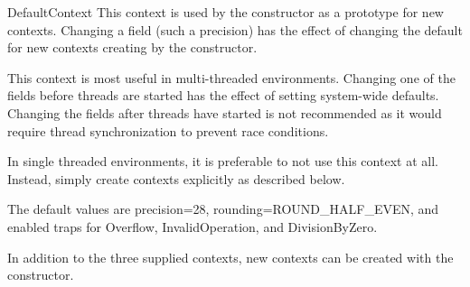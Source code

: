 \begin{classdesc*}{DefaultContext}
  This context is used by the  constructor as a prototype for
  new contexts.  Changing a field (such a precision) has the effect of
  changing the default for new contexts creating by the 
  constructor.

  This context is most useful in multi-threaded environments.  Changing one of
  the fields before threads are started has the effect of setting system-wide
  defaults.  Changing the fields after threads have started is not recommended
  as it would require thread synchronization to prevent race conditions.

  In single threaded environments, it is preferable to not use this context
  at all.  Instead, simply create contexts explicitly as described below.

  The default values are precision=28, rounding=ROUND_HALF_EVEN, and enabled
  traps for Overflow, InvalidOperation, and DivisionByZero.
\end{classdesc*}


In addition to the three supplied contexts, new contexts can be created
with the  constructor.

